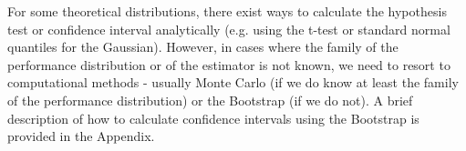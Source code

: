 \documentclass{article}
\newcommand{\ml}{\gls{ml}\xspace}
\newcommand{\boo}[1]{\text{Boo}_{#1}}
\newcommand{\Em}[1]{\boo{#1}}
\newcommand{\emn}{\Em{n}}
\begin{document}
For some theoretical distributions, there exist ways to calculate the hypothesis test or confidence interval analytically (e.g. using the t-test or standard normal quantiles for the Gaussian). However, in cases where the family of the performance distribution or of the estimator is not known, we need to resort to computational methods - usually Monte Carlo (if we do know at least the family of the performance distribution) or the Bootstrap \citep{efron79} (if we do not). A brief description of how to calculate confidence intervals using the Bootstrap is provided in the Appendix.




\end{document}
